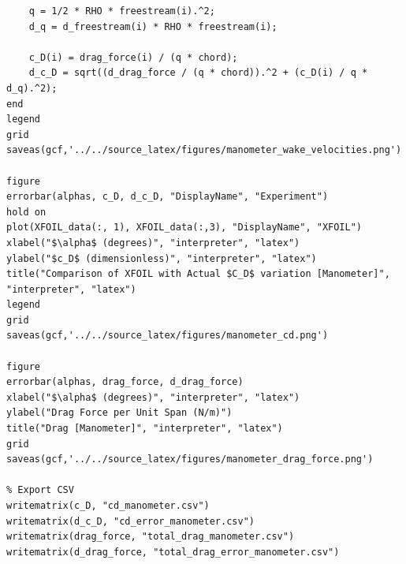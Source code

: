 \documentclass[runningheads]{llncs}
\begin{document}
\begin{verbatim}
    q = 1/2 * RHO * freestream(i).^2;
    d_q = d_freestream(i) * RHO * freestream(i);
    
    c_D(i) = drag_force(i) / (q * chord);
    d_c_D = sqrt((d_drag_force / (q * chord)).^2 + (c_D(i) / q * d_q).^2);
end
legend
grid
saveas(gcf,'../../source_latex/figures/manometer_wake_velocities.png')

figure
errorbar(alphas, c_D, d_c_D, "DisplayName", "Experiment")
hold on
plot(XFOIL_data(:, 1), XFOIL_data(:,3), "DisplayName", "XFOIL")
xlabel("$\alpha$ (degrees)", "interpreter", "latex")
ylabel("$c_D$ (dimensionless)", "interpreter", "latex")
title("Comparison of XFOIL with Actual $C_D$ variation [Manometer]", "interpreter", "latex")
legend
grid
saveas(gcf,'../../source_latex/figures/manometer_cd.png')

figure
errorbar(alphas, drag_force, d_drag_force)
xlabel("$\alpha$ (degrees)", "interpreter", "latex")
ylabel("Drag Force per Unit Span (N/m)")
title("Drag [Manometer]", "interpreter", "latex")
grid
saveas(gcf,'../../source_latex/figures/manometer_drag_force.png')

% Export CSV
writematrix(c_D, "cd_manometer.csv")
writematrix(d_c_D, "cd_error_manometer.csv")
writematrix(drag_force, "total_drag_manometer.csv")
writematrix(d_drag_force, "total_drag_error_manometer.csv")
\end{verbatim}
\end{document}
